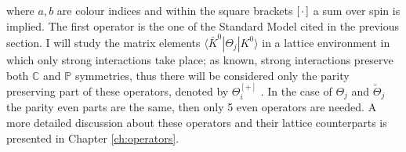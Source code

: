 \documentclass[english, LaM, oneside, noexaminfo]{sapthesis}
\newcommand{\la}{\langle}
\newcommand{\ra}{\rangle}
\begin{document}
where $a,b$ are colour indices and within the square brackets $[\hspace*{0.5mm}\cdot\hspace*{0.5mm}]$ a sum over spin is implied.
The first operator is the one of the Standard Model cited in the previous section.
I will study the matrix elements $\la \bar K^0 | \Theta_j | K^0 \ra$ in a lattice environment in which only strong interactions take place; as known, strong interactions preserve both $\mathbb{C}$ and $\mathbb{P}$ symmetries, thus there will be considered only the parity preserving part of these operators, denoted by $\Theta_i^{[+]}$ \cite{KMBSM}.
In the case of $\Theta_j$ and $\tilde\Theta_j$ the parity even parts are the same, then only 5 even operators are needed.
A more detailed discussion about these operators and their lattice counterparts is presented in Chapter \ref{ch:operators}.
\end{document}

